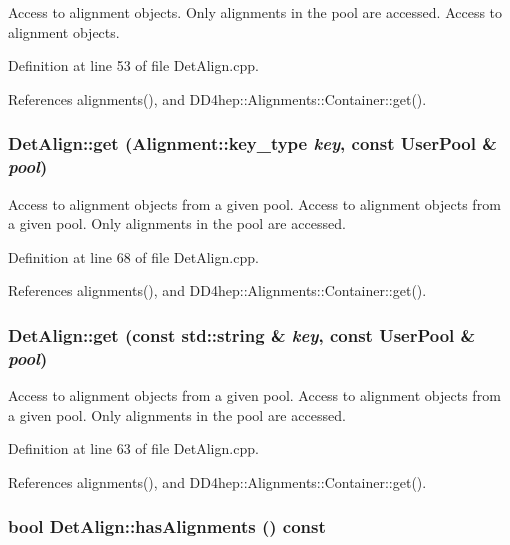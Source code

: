 Access to alignment objects. Only alignments in the pool are accessed. Access to alignment objects. 

Definition at line 53 of file DetAlign.cpp.

References alignments(), and DD4hep::Alignments::Container::get().\hypertarget{class_d_d4hep_1_1_alignments_1_1_det_align_a25f066eaf3999061359f7a46fbd4cfe1}{
\subsubsection[{get}]{ DetAlign::get ({\bf Alignment::key\_\-type} {\em key}, \/  const {\bf UserPool} \& {\em pool})}}
\label{class_d_d4hep_1_1_alignments_1_1_det_align_a25f066eaf3999061359f7a46fbd4cfe1}


Access to alignment objects from a given pool. Access to alignment objects from a given pool. Only alignments in the pool are accessed. 

Definition at line 68 of file DetAlign.cpp.

References alignments(), and DD4hep::Alignments::Container::get().\hypertarget{class_d_d4hep_1_1_alignments_1_1_det_align_a1487afd0d23a2ce523b29c7e502bf0bd}{
\subsubsection[{get}]{ DetAlign::get (const std::string \& {\em key}, \/  const {\bf UserPool} \& {\em pool})}}
\label{class_d_d4hep_1_1_alignments_1_1_det_align_a1487afd0d23a2ce523b29c7e502bf0bd}


Access to alignment objects from a given pool. Access to alignment objects from a given pool. Only alignments in the pool are accessed. 

Definition at line 63 of file DetAlign.cpp.

References alignments(), and DD4hep::Alignments::Container::get().\hypertarget{class_d_d4hep_1_1_alignments_1_1_det_align_a2a82c5cc1e3a35618b6e5fb74d93cffd}{
\subsubsection[{hasAlignments}]{\setlength{\rightskip}{0pt plus 5cm}bool DetAlign::hasAlignments () const}}
\label{class_d_d4hep_1_1_alignments_1_1_det_align_a2a82c5cc1e3a35618b6e5fb74d93cffd}


